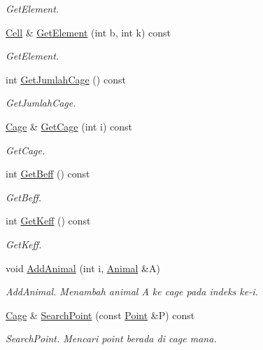 \begin{DoxyCompactItemize}
\begin{DoxyCompactList}\small\item\em Get\+Element. \end{DoxyCompactList}\item 
\hyperlink{classCell}{Cell} \& \hyperlink{classZoo_a5d21cf8cb0acdc6d4c9b625699a1d4a9}{Get\+Element} (int b, int k) const 
\begin{DoxyCompactList}\small\item\em Get\+Element. \end{DoxyCompactList}\item 
int \hyperlink{classZoo_ae0465354e9418560540b516b8563a590}{Get\+Jumlah\+Cage} () const 
\begin{DoxyCompactList}\small\item\em Get\+Jumlah\+Cage. \end{DoxyCompactList}\item 
\hyperlink{classCage}{Cage} \& \hyperlink{classZoo_a3956c403bc9f854aba57146896d264ea}{Get\+Cage} (int i) const 
\begin{DoxyCompactList}\small\item\em Get\+Cage. \end{DoxyCompactList}\item 
int \hyperlink{classZoo_a21590932eb500dd07226c1bbe2ce4726}{Get\+Beff} () const 
\begin{DoxyCompactList}\small\item\em Get\+Beff. \end{DoxyCompactList}\item 
int \hyperlink{classZoo_a759d40e997b024236da2a503662dca88}{Get\+Keff} () const 
\begin{DoxyCompactList}\small\item\em Get\+Keff. \end{DoxyCompactList}\item 
void \hyperlink{classZoo_ad18e52d6cec53c6adb5887bcc585a758}{Add\+Animal} (int i, \hyperlink{classAnimal}{Animal} \&A)
\begin{DoxyCompactList}\small\item\em Add\+Animal. Menambah animal A ke cage pada indeks ke-\/i. \end{DoxyCompactList}\item 
\hyperlink{classCage}{Cage} \& \hyperlink{classZoo_a99470f6b1415873b4e5f8cd25b2cf5a6}{Search\+Point} (const \hyperlink{classPoint}{Point} \&P) const 
\begin{DoxyCompactList}\small\item\em Search\+Point. Mencari point berada di cage mana. \end{DoxyCompactList}\item 

\end{DoxyCompactItemize}
